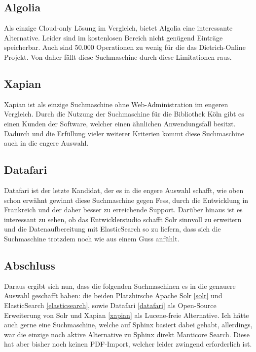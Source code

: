 \subsection{Algolia}

Als einzige Cloud-only Lösung im Vergleich, bietet Algolia eine interessante Alternative. Leider sind im kostenlosen Bereich nicht genügend Einträge speicherbar. Auch sind 50.000 Operationen zu wenig für die das Dietrich-Online Projekt. Von daher fällt diese Suchmaschine durch diese Limitationen raus. \cite{Algolia.2019}

\subsection{Xapian}

Xapian ist als einzige Suchmaschine ohne Web-Administration im engeren Vergleich. Durch die Nutzung der Suchmaschine für die Bibliothek Köln gibt es einen Kunden der Software, welcher einen ähnlichen Anwendungsfall besitzt. \cite{Xapian.2019} Dadurch und die Erfüllung vieler weiterer Kriterien kommt diese Suchmaschine auch in die engere Auswahl. \cite{XAP.2019}

\subsection{Datafari}

Datafari ist der letzte Kandidat, der es in die engere Auswahl schafft, wie oben schon erwähnt gewinnt diese Suchmaschine gegen Fess, durch die Entwicklung in Frankreich und der daher besser zu erreichende Support. Darüber hinaus ist es interessant zu sehen, ob das Entwicklerstudio schafft Solr sinnvoll zu erweitern und die Datenaufbereitung mit ElasticSearch so zu liefern, dass sich die Suchmaschine trotzdem noch wie aus einem Guss anfühlt. \cite{Labs.b}


\subsection{Abschluss}

Daraus ergibt sich nun, dass die folgenden Suchmaschinen es in die genauere Auswahl geschafft haben: die beiden Platzhirsche Apache Solr \ref{solr} und ElasticSearch \ref{elasticsearch}, sowie Datafari \ref{datafari} als Open-Source Erweiterung von Solr und Xapian \ref{xapian} als Lucene-freie Alternative. Ich hätte auch gerne eine Suchmaschine, welche auf Sphinx basiert dabei gehabt, allerdings, war die einzige noch aktive Alternative zu Sphinx direkt Manticore Search. Diese hat aber bisher noch keinen PDF-Import, welcher leider zwingend erforderlich ist. 



